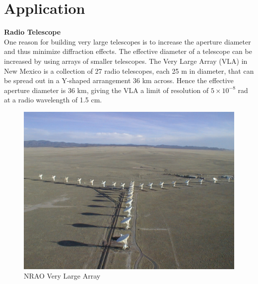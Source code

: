 \documentclass[a4paper,12pt]{report}
\begin{document}
\chapter{Application}
\textbf{Radio Telescope}\\
One reason for building very large telescopes
is to increase the aperture diameter and thus
minimize diffraction effects. The effective
diameter of a telescope can be increased by
using arrays of smaller telescopes. The Very
Large Array (VLA) in New Mexico is a collection
of 27 radio telescopes, each 25 m in
diameter, that can be spread out in a Y-shaped
arrangement 36 km across. Hence the
effective aperture diameter is 36 km, giving
the VLA a limit of resolution of $5\times10^{-8}$ rad at a radio wavelength of 1.5 cm.
\begin{figure}[h]
\centering
\includegraphics[width=0.7\linewidth, height=0.3\textheight]{vla}
\caption{NRAO Very Large Array}
\label{fig:vla}
\end{figure}
\end{document}
